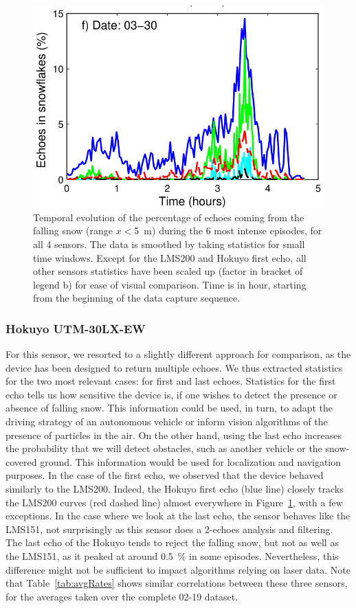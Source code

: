 \begin{figure}[h]
    \includegraphics[width=0.45\linewidth]{./img/chap_lidar/timings_cropped_f.png}
    \caption{Temporal evolution of the percentage of echoes coming from the falling snow (range $x<$\SI{5}{\meter}) during the 6 most intense episodes, for all 4 sensors. The data is smoothed by taking statistics for small time windows. Except for the LMS200 and Hokuyo first echo, all other sensors statistics have been scaled up (factor in bracket of legend b) for ease of visual comparison. Time is in hour, starting from the beginning of the data capture sequence.}
    \label{fig:TimingSnow}
\end{figure}


\subsubsection{Hokuyo UTM-30LX-EW}
For this sensor, we resorted to a slightly different approach for comparison, as the device has been designed to return multiple echoes. We thus extracted statistics for the two most relevant cases: for first and last echoes. Statistics for the first echo tells us how sensitive the device is, if one wishes to detect the presence or absence of falling snow. This information could be used, in turn, to adapt the driving strategy of an autonomous vehicle or inform vision algorithms of the presence of particles in the air. On the other hand, using the last echo increases the probability that we will detect obstacles, such as another vehicle or the snow-covered ground. This information would be used for localization and navigation purposes. In the case of the first echo, we observed that the device behaved similarly to the LMS200. Indeed, the Hokuyo first echo (blue line) closely tracks the LMS200 curves (red dashed line) almost everywhere in Figure~\ref{fig:TimingSnow}, with a few exceptions.  In the case where we look at the last echo, the sensor behaves like the LMS151, not surprisingly as this sensor does a 2-echoes analysis and filtering. The last echo of the Hokuyo tends to reject the falling snow, but not as well as the LMS151, as it peaked at around 0.5~\% in some episodes. Nevertheless, this difference might not be sufficient to impact algorithms relying on laser data. Note that Table~\ref{tab:avgRates} shows similar correlations between these three sensors, for the averages taken over the complete 02-19 dataset.

